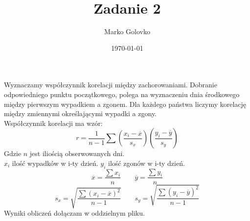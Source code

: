 \documentclass[12pt]{article}
\title{Zadanie 2}
\author{Marko Golovko}
\date{\today}
\begin{document}
\maketitle
Wyznaczamy współczynnik korelacji między zachorowaniami. Dobranie odpowiedniego punktu początkowego, polega na wyznaczeniu dnia środkowego między pierwszym wypadkiem a zgonem. Dla każdego państwa liczymy korelację między zmiennymi określającymi wypadki a zgony. \\ 
Współczynnik korelacji ma wzór:
	$$ r = \frac{1}{n-1}\sum{(\frac{x_{i}-\overline{x}}{s_{x}})(\frac{y_{i}-\overline{y}}{s_{y}})} $$
Gdzie $n$ jest iliością obserwowanych dni. \\
$x_{i}$ ilość wypadków w i-ty dzień. $y_{i}$ ilość zgonów w i-ty dzień. \\
$$ \overline{x} = \frac{\sum{x_i}}{n} \quad \quad \overline{y} = \frac{\sum{y_i}}{n}$$
$$ s_{x} = \sqrt{\frac{\sum{(x_{i}-\overline{x})^2}}{n-1}} \quad \quad s_{y} = \sqrt{\frac{\sum{(y_{i}-\overline{y})^2}}{n-1}} $$
Wyniki obliczeń dołączam w oddzielnym pliku.
\cleardoublepage

\end{document}
